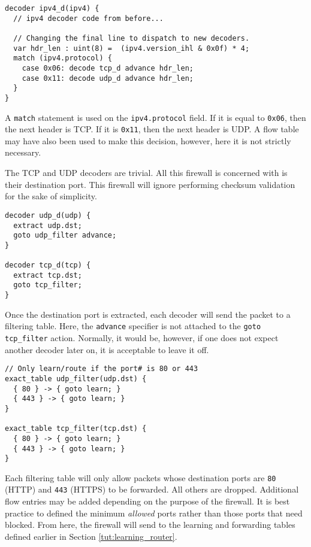 \begin{codepage}
\begin{lstlisting}
decoder ipv4_d(ipv4) {
  // ipv4 decoder code from before...
  
  // Changing the final line to dispatch to new decoders.
  var hdr_len : uint(8) =  (ipv4.version_ihl & 0x0f) * 4;
  match (ipv4.protocol) {
    case 0x06: decode tcp_d advance hdr_len;
    case 0x11: decode udp_d advance hdr_len;
  }
}
\end{lstlisting}
\end{codepage} 

A \texttt{match} statement is used on the \texttt{ipv4.protocol} field. If it is equal to \texttt{0x06}, then the next header is TCP. If it is \texttt{0x11}, then the next header is UDP. A flow table may have also been used to make this decision, however, here it is not strictly necessary.

The TCP and UDP decoders are trivial. All this firewall is concerned with is their destination port. This firewall will ignore performing checksum validation for the sake of simplicity. 

\begin{codepage}
\begin{lstlisting}
decoder udp_d(udp) {
  extract udp.dst;
  goto udp_filter advance;
}

decoder tcp_d(tcp) {
  extract tcp.dst;
  goto tcp_filter;
}
\end{lstlisting}
\end{codepage}

Once the destination port is extracted, each decoder will send the packet to 
a filtering table. Here, the \texttt{advance} specifier is not attached to the 
\texttt{goto tcp\_filter} action. Normally, it would be, however, if one does 
not expect another decoder later on, it is acceptable to leave it off.

\begin{codepage}
\begin{lstlisting}
// Only learn/route if the port# is 80 or 443
exact_table udp_filter(udp.dst) {
  { 80 } -> { goto learn; }
  { 443 } -> { goto learn; }
}

exact_table tcp_filter(tcp.dst) {
  { 80 } -> { goto learn; }
  { 443 } -> { goto learn; }
}
\end{lstlisting}
\end{codepage}

Each filtering table will only allow packets whose destination ports are \texttt{80} (HTTP) and \texttt{443} (HTTPS) to be forwarded. All others are dropped. Additional flow entries may be added depending on the purpose of the firewall. It is best practice to defined the minimum \textit{allowed} ports rather than those ports that need blocked. From here, the firewall will send to the learning and forwarding tables defined earlier in Section \ref{tut:learning_router}.

